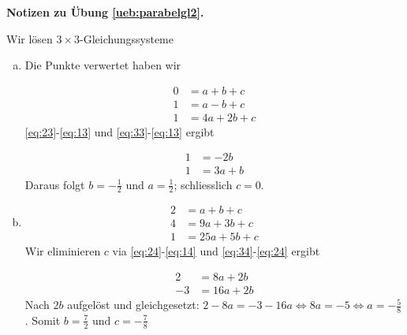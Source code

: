 \documentclass[%
11pt,%
twoside,%
titlepage,%
german,%
headsepline%
]{scrartcl}
\newcommand{\concatueb}[1]{ueb:#1}%
\newcommand{\concatlsg}[1]{lsg:#1}%
\newenvironment{lsg}[1]{%
    \par\noindent\textbf{Notizen zu Übung \ref{\concatueb{#1}}.}%
    \label{\concatlsg{#1}}
}{%
    \par%
}
\begin{document}
\begin{lsg}{parabelgl2}
Wir lösen $3\times3$-Gleichungssysteme
    \begin{enumerate}[a)]
        \item Die Punkte verwertet haben wir

        \begin{align}
            0 &= a+b+c\label{eq:13}\\
            1 &= a-b+c\label{eq:23}\\
            1 &= 4a+2b+c\label{eq:33}
        \end{align}
        \eqref{eq:23}-\eqref{eq:13} und \eqref{eq:33}-\eqref{eq:13} ergibt

        \begin{align*}
            1 &= -2b\\
            1 &= 3a+b
        \end{align*}
        Daraus folgt $b=-\frac{1}{2}$ und $a=\frac{1}{2}$; schliesslich $c=0$.

        \item \begin{align}
            2 &= a+b+c\label{eq:14}\\
            4 &= 9a+3b+c\label{eq:24}\\
            1 &= 25a+5b+c\label{eq:34}
        \end{align}
        Wir eliminieren $c$ via \eqref{eq:24}-\eqref{eq:14} und \eqref{eq:34}-\eqref{eq:24} ergibt

        \begin{align*}
            2 &= 8a+2b\\
            -3 &= 16a+2b
        \end{align*}
        Nach $2b$ aufgelöst und gleichgesetzt: $2-8a=-3-16a\Leftrightarrow 8a=-5\Leftrightarrow a=-\frac{5}{8}$. Somit $b=\frac{7}{2}$ und $c=-\frac{7}{8}$
    \end{enumerate}
\end{lsg}
\end{document}
